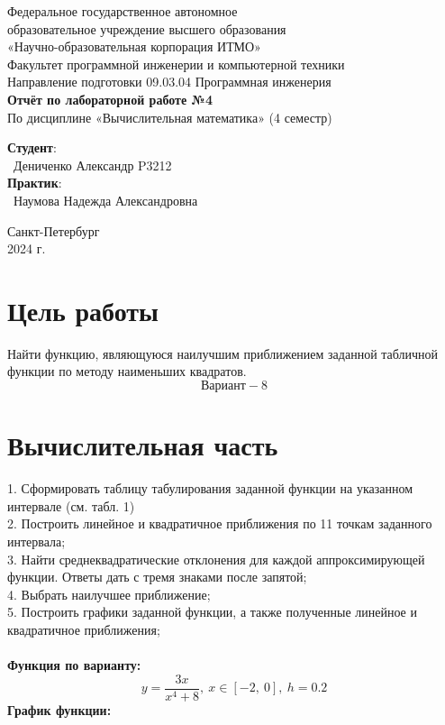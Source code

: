 \documentclass{article}
\begin{document}
\begin{center}
    \Large
    Федеральное государственное автономное \\
    образовательное учреждение высшего образования \\ 
    «Научно-образовательная корпорация ИТМО»\\
    \vspace{0.5cm}
    \large
    Факультет программной инженерии и компьютерной техники \\
    Направление подготовки 09.03.04 Программная инженерия \\
    \vspace{1cm}
    \Large
    \textbf{Отчёт по лабораторной работе №4} \\
    По дисциплине «Вычислительная математика» (4 семестр)\\
    \large
    \vspace{8cm}

    \begin{minipage}{.33\textwidth}
    \end{minipage}
    \hfill
    \begin{minipage}{.4\textwidth}
    
        \textbf{Студент}: \vspace{.1cm} \\
        \ Дениченко Александр P3212\\
        \textbf{Практик}:  \\
        \ Наумова Надежда Александровна
    \end{minipage}
    \vfill
Санкт-Петербург\\ 2024 г.
\end{center}
\pagestyle{empty}
\newpage
\pagestyle{plain}
\section{Цель работы}
Найти функцию, являющуюся наилучшим приближением заданной табличной функции по методу наименьших квадратов.\[\text{Вариант} - 8\]
\section{Вычислительная часть}
1. Сформировать таблицу табулирования заданной функции на указанном интервале (см. табл. 1)\\
2. Построить линейное и квадратичное приближения по 11 точкам заданного интервала;\\
3. Найти среднеквадратические отклонения для каждой аппроксимирующей функции. Ответы дать с тремя знаками после запятой;\\
4. Выбрать наилучшее приближение;\\
5. Построить графики заданной функции, а также полученные линейное и квадратичное приближения;\\
\\
\textbf{Функция по варианту:}
\[y = \frac{3x}{x^4+8},\ x\in [-2,\ 0],\ h=0.2\]
\textbf{График функции:}
\end{document}
